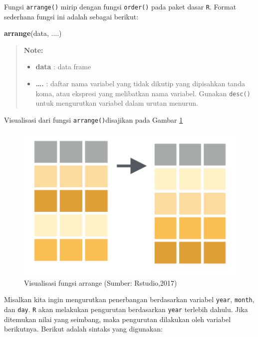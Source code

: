 \documentclass[]{book}
\newenvironment{Shaded}{\begin{snugshade}}{\end{snugshade}}
\newcommand{\KeywordTok}[1]{\textcolor[rgb]{0.13,0.29,0.53}{\textbf{#1}}}
\newcommand{\NormalTok}[1]{#1}
\providecommand{\tightlist}{%
  \setlength{\itemsep}{0pt}\setlength{\parskip}{0pt}}
\begin{document}
Fungsi \texttt{arrange()} mirip dengan fungsi \texttt{order()} pada
paket dasar \texttt{R}. Format sederhana fungsi ini adalah sebagai
berikut:

\begin{Shaded}
\begin{Highlighting}[]
\KeywordTok{arrange}\NormalTok{(data, ....)}
\end{Highlighting}
\end{Shaded}

\begin{quote}
\textbf{Note: }

\begin{itemize}
\tightlist
\item
  \textbf{data} : data frame
\item
  \textbf{\ldots{}.} : daftar nama variabel yang tidak dikutip yang
  dipisahkan tanda koma, atau ekspresi yang melibatkan nama variabel.
  Gunakan \texttt{desc()} untuk mengurutkan variabel dalam urutan
  menurun.
\end{itemize}
\end{quote}

Visualisasi dari fungsi \texttt{arrange()}disajikan pada Gambar
\ref{fig:arrange}

\begin{figure}

{\centering \includegraphics[width=5.74in]{arrange} 

}

\caption{Visualisasi fungsi arrange (Sumber: Rstudio,2017)}\label{fig:arrange}
\end{figure}

Misalkan kita ingin mengurutkan penerbangan berdasarkan variabel
\texttt{year}, \texttt{month}, dan \texttt{day}. \texttt{R} akan
melakukan pengurutan berdasarkan \texttt{year} terlebih dahulu. Jika
ditemukan nilai yang seimbang, maka pengurutan dilakukan oleh variabel
berikutnya. Berikut adalah sintaks yang digunakan:
\end{document}
